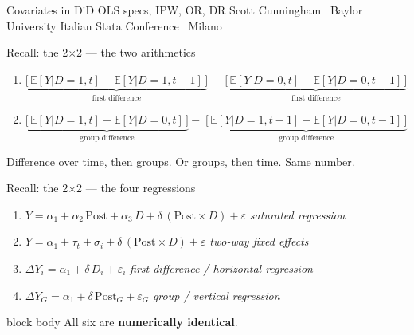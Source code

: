 \documentclass[aspectratio=169,11pt]{beamer}
\newcommand{\emphbox}[1]{%
  \begin{beamercolorbox}[rounded=true,sep=7pt,wd=\linewidth]{block body}%
    \small\color{slate} #1%
  \end{beamercolorbox}}
\begin{document}
\codechellatitle
  {Covariates in DiD}
  {OLS specs, IPW, OR, DR}
  {Scott Cunningham \textperiodcentered\ Baylor University}
  {Italian Stata Conference \textperiodcentered\ Milano}


\begin{frame}{Recall: the 2$\times$2 --- the two arithmetics}
\vspace{0.8em}
{\small
\begin{enumerate}\setlength\itemsep{1.2em}

  \item $\underbrace{\bigl[\,\mathbb{E}[Y|D{=}1,t]
         - \mathbb{E}[Y|D{=}1,t{-}1]\,\bigr]}_{\text{first difference}}
        -\;
        \underbrace{\bigl[\,\mathbb{E}[Y|D{=}0,t]
         - \mathbb{E}[Y|D{=}0,t{-}1]\,\bigr]}_{\text{first difference}}$

  \item $\underbrace{\bigl[\,\mathbb{E}[Y|D{=}1,t]
         - \mathbb{E}[Y|D{=}0,t]\,\bigr]}_{\text{group difference}}
        -\;
        \underbrace{\bigl[\,\mathbb{E}[Y|D{=}1,t{-}1]
         - \mathbb{E}[Y|D{=}0,t{-}1]\,\bigr]}_{\text{group difference}}$

\end{enumerate}
}
\vspace{0.8em}
\begin{center}\color{warmgray}
Difference over time, then groups. \;Or groups, then time. \;Same number.
\end{center}
\end{frame}

\begin{frame}{Recall: the 2$\times$2 --- the four regressions}
\vspace{0.6em}
{\small
\begin{enumerate}\setlength\itemsep{0.9em}
  \item[3.] $Y = \alpha_1 + \alpha_2\,\mathrm{Post} + \alpha_3\,D
         + \delta\,(\mathrm{Post}\times D) + \varepsilon$
        \hfill{\color{warmgray}\itshape saturated regression}

  \item[4.] $Y = \alpha_1 + \tau_t + \sigma_i
         + \delta\,(\mathrm{Post}\times D) + \varepsilon$
        \hfill{\color{warmgray}\itshape two-way fixed effects}

  \item[5.] $\Delta Y_i = \alpha_1 + \delta\,D_i + \varepsilon_i$
        \hfill{\color{warmgray}\itshape first-difference / horizontal regression}

  \item[6.] $\Delta\bar{Y}_G = \alpha_1 + \delta\,\mathrm{Post}_G + \varepsilon_G$
        \hfill{\color{warmgray}\itshape group / vertical regression}

\end{enumerate}
}
\vspace{0.6em}
\emphbox{All six are \textbf{numerically identical}.}
\end{frame}
\end{document}
